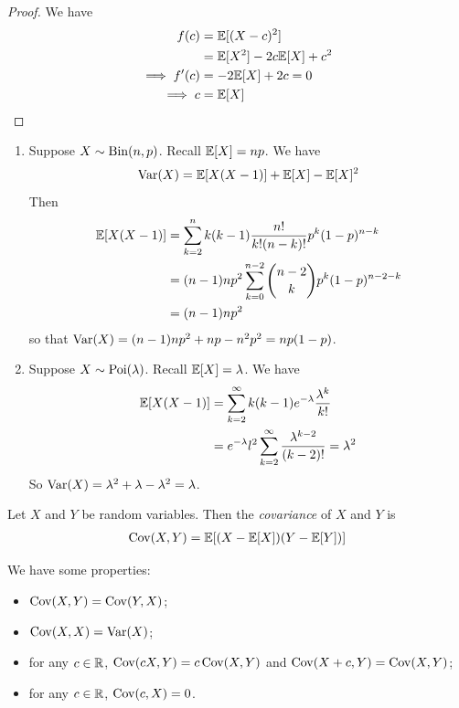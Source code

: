 \documentclass{../../template/note}
\begin{document}
    \begin{proof}
        We have
        \begin{align*}
            f(c) &= \mathbb E[(X-c)^2] \\
            &= \mathbb E[X^2] - 2c\mathbb E[X] + c^2 \\
            \implies f'(c) &= -2\mathbb E[X] + 2c = 0 \\
            \implies c &= \mathbb E[X]
        \end{align*}
    \end{proof}
    
    \begin{example}
        \begin{enumerate}[label=\protect\circled{\arabic*}]
            \item Suppose \(X \sim \operatorname{Bin}(n, p)\). Recall \(\mathbb E[X] = np\). We have
            \begin{align*}
                \operatorname{Var}(X) = \mathbb E[X(X-1)] + \mathbb E[X] - \mathbb E[X]^2
            \end{align*}
            Then
            \begin{align*}
                \mathbb E[X(X-1)] &= \sum_{k=2}^n k(k-1) \frac{n!}{k!(n-k)!}p^k(1-p)^{n-k} \\
                &= (n-1)np^2 \sum_{k=0}^{n-2} \binom{n-2}{k} p^k (1-p)^{n-2-k} \\
                &= (n-1)np^2
            \end{align*}
            so that \(\operatorname{Var}(X) = (n-1)np^2 + np - n^2p^2 = np(1-p)\).
            \item Suppose \(X \sim \operatorname{Poi}(\lambda)\). Recall \(\mathbb E[X] = \lambda\). We have
            \begin{align*}
                \mathbb E[X(X-1)] &= \sum_{k=2}^\infty k(k-1) e^{-\lambda}\frac{\lambda^k}{k!} \\
                &= e^{-\lambda}l^2 \sum_{k=2}^\infty \frac{\lambda^{k-2}}{(k-2)!} = \lambda^2
            \end{align*}
            So \(\operatorname{Var}(X) = \lambda^2 + \lambda - \lambda^2 = \lambda\).
        \end{enumerate}
    \end{example}
    
    \begin{definition}
        Let \(X\) and \(Y\) be random variables. Then the \emph{covariance} of \(X\) and \(Y\) is
        \begin{align*}
            \operatorname{Cov}(X, Y) = \mathbb E[(X-\mathbb E[X])(Y-\mathbb E[Y])]
        \end{align*}
    \end{definition}
    We have some properties:
    \begin{itemize}
        \item \(\operatorname{Cov}(X, Y) = \operatorname{Cov}(Y, X)\);
        \item \(\operatorname{Cov}(X, X) = \operatorname{Var}(X)\);
        \item for any \(c \in \mathbb R\), \(\operatorname{Cov}(cX, Y) = c\operatorname{Cov}(X, Y)\) and \(\operatorname{Cov}(X + c, Y) = \operatorname{Cov}(X, Y)\);
        \item for any \(c \in \mathbb R\), \(\operatorname{Cov}(c, X) = 0\).
    \end{itemize}
    
\end{document}

